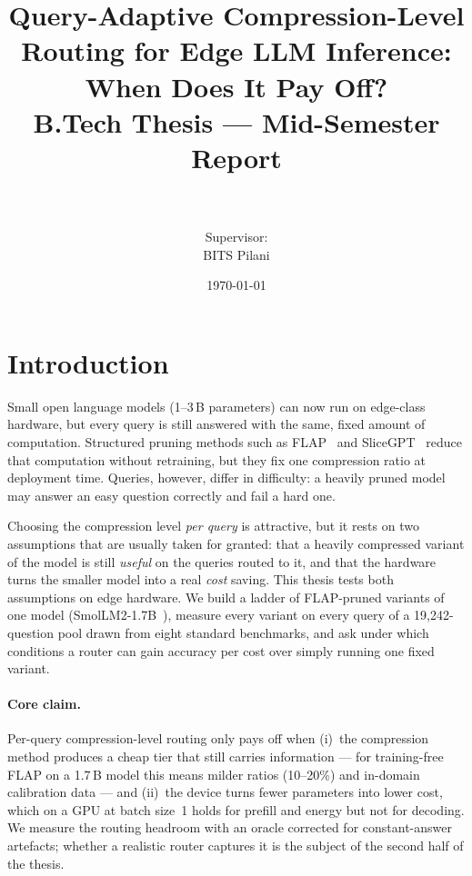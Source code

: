 \documentclass[11pt,a4paper]{article}
\title{Query-Adaptive Compression-Level Routing for Edge LLM Inference:\\
\Large When Does It Pay Off?\\[4pt]
\large B.Tech Thesis --- Mid-Semester Report}
\author{\AUTHOR\\ \small\texttt{\IDNO}\\[2pt] \normalsize Supervisor: \SUPERVISOR\\ BITS Pilani}
\date{\today}
\begin{document}
\maketitle

\begin{abstract}

\end{abstract}

\tableofcontents
\newpage

\section{Introduction}
Small open language models (1--3\,B parameters) can now run on edge-class hardware, but every
query is still answered with the same, fixed amount of computation. Structured pruning methods
such as FLAP~\citep{an2024flap} and SliceGPT~\citep{ashkboos2024slicegpt} reduce that computation
without retraining, but they fix one compression ratio at deployment time. Queries, however, differ
in difficulty: a heavily pruned model may answer an easy question correctly and fail a hard one.

Choosing the compression level \emph{per query} is attractive, but it rests on two assumptions that are
usually taken for granted: that a heavily compressed variant of the model is still \emph{useful} on the
queries routed to it, and that the hardware turns the smaller model into a real \emph{cost} saving. This
thesis tests both assumptions on edge hardware. We build a ladder of FLAP-pruned variants of one model
(SmolLM2-1.7B~\citep{allal2025smollm2}), measure every variant on every query of a 19{,}242-question pool
drawn from eight standard benchmarks, and ask under which conditions a router can gain accuracy per cost
over simply running one fixed variant.

\paragraph{Core claim.} Per-query compression-level routing only pays off when (i)~the compression method
produces a cheap tier that still carries information --- for training-free FLAP on a 1.7\,B model this
means milder ratios (10--20\%) and in-domain calibration data --- and (ii)~the device turns fewer parameters
into lower cost, which on a
GPU at batch size~1 holds for prefill and energy but not for decoding. We measure the routing headroom with
an oracle corrected for constant-answer artefacts; whether a realistic router captures it is the subject of
the second half of the thesis.
\end{document}
